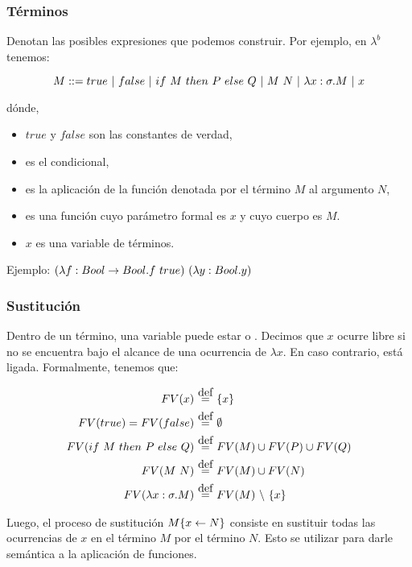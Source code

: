 \subsubsection{Términos}

Denotan las posibles expresiones que podemos construir. Por ejemplo, en $\lambda^b$ tenemos:

\[ M ::= true \ |\  false \ |\  if\ M\ then\ P\ else\ Q \ |\  M\ N \ |\  \lambda x:\sigma.M \ |\  x \]

dónde,
\begin{itemize}
  \item $true$ y $false$ son las constantes de verdad,
  \item {} es el condicional,
  \item {} es la aplicación de la función denotada por el término $M$ al argumento $N$,
  \item {} es una función cuyo parámetro formal es $x$ y cuyo cuerpo es $M$.
  \item $x$ es una variable de términos.
\end{itemize}

Ejemplo: $\app{(\abs{f}{Bool \to Bool}{f\ true})}{(\abs{y}{Bool}{y})}$

\subsubsection{Sustitución}

Dentro de un término, una variable puede estar  o . Decimos que $x$ ocurre libre si no se encuentra bajo el alcance de una ocurrencia de $\lambda x$. En caso contrario, está ligada. Formalmente, tenemos que:

\begin{align*}
FV(x) &\eqdef \{x\} \\
FV(true) = FV (false) &\eqdef \emptyset \\
FV(\ifte{M}{P}{Q}) &\eqdef FV(M) \cup FV(P) \cup FV(Q) \\
FV(\app{M}{N}) &\eqdef FV(M) \cup FV(N) \\
FV(\abs{x}{\sigma}{M}) &\eqdef FV(M)\ \backslash\ \{x\} \\
\end{align*}

Luego, el proceso de sustitución $M\{x \leftarrow N\}$ consiste en sustituir todas las ocurrencias  de $x$ en el término $M$ por el término $N$. Esto se utilizar para darle semántica a la aplicación de funciones.

